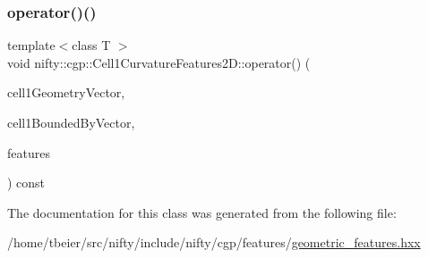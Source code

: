 \mbox{\label{classnifty_1_1cgp_1_1Cell1CurvatureFeatures2D_a23557b26a4039ab1ce2ba316511bf767}} 
\subsubsection{\texorpdfstring{operator()()}{operator()()}}
{\footnotesize\ttfamily template$<$class T $>$ \\
void nifty\+::cgp\+::\+Cell1\+Curvature\+Features2\+D\+::operator() (\begin{DoxyParamCaption}\item[{const \hyperlink{classnifty_1_1cgp_1_1CellGeometryVector}{Cell\+Geometry\+Vector}$<$ 2, 1 $>$ \&}]{cell1\+Geometry\+Vector,  }\item[{const \hyperlink{classnifty_1_1cgp_1_1CellBoundedByVector}{Cell\+Bounded\+By\+Vector}$<$ 2, 1 $>$ \&}]{cell1\+Bounded\+By\+Vector,  }\item[{\hyperlink{classandres_1_1View}{nifty\+::marray\+::\+View}$<$ T $>$ \&}]{features }\end{DoxyParamCaption}) const\hspace{0.3cm}{\ttfamily [inline]}}



The documentation for this class was generated from the following file\+:\begin{DoxyCompactItemize}
\item 
/home/tbeier/src/nifty/include/nifty/cgp/features/\hyperlink{geometric__features_8hxx}{geometric\+\_\+features.\+hxx}\end{DoxyCompactItemize}
